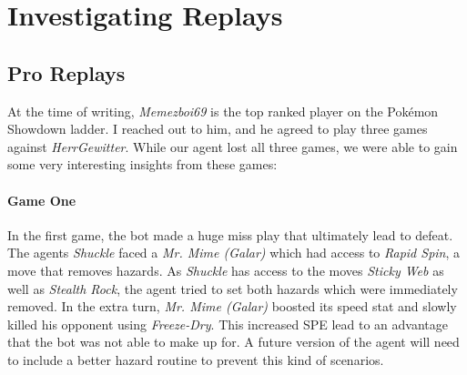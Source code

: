 
\section{Investigating Replays}
\todo{}

\subsection{Pro Replays}
At the time of writing, \textit{Memezboi69} is the top ranked player on the Pokémon Showdown ladder. I reached
out to him, and he agreed to play three games against \textit{HerrGewitter}. While our agent lost all three 
games, we were able to gain some very interesting insights from these games:

\paragraph{Game One}
In the first game, the bot made a huge miss play that ultimately lead to defeat. The agents \textit{Shuckle} faced a 
\textit{Mr. Mime (Galar)} which had access to \textit{Rapid Spin}, a move that removes hazards. As \textit{Shuckle}
has access to the moves \textit{Sticky Web} as well as \textit{Stealth Rock}, the agent tried to set both hazards
which were immediately removed. In the extra turn, \textit{Mr. Mime (Galar)} boosted its speed stat and slowly
killed his opponent using \textit{Freeze-Dry}. This increased \ac{SPE} lead to an advantage that the bot was
not able to make up for. A future version of the agent will need to include a better hazard routine to prevent
this kind of scenarios.  

